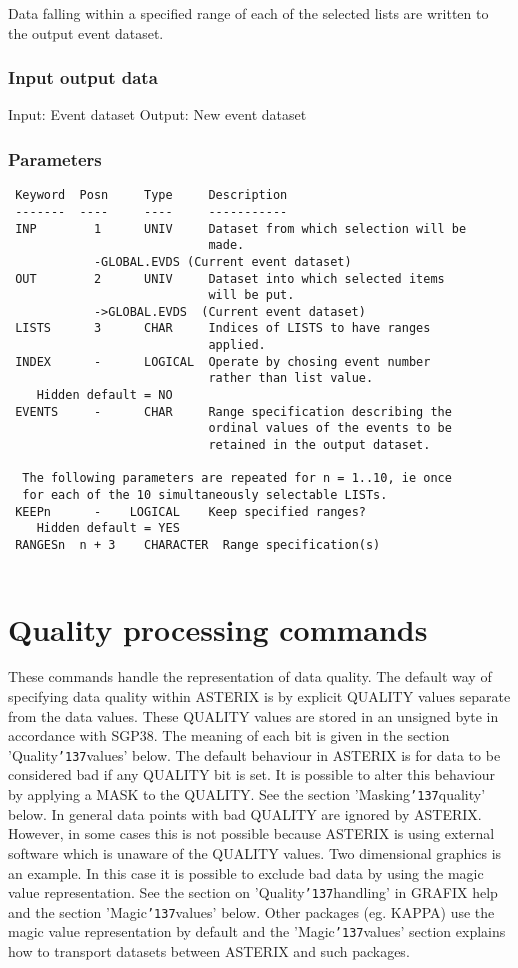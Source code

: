 \documentclass{book}
\renewcommand{\_}{{\tt\char'137}}     %
\begin{document}
Data falling within a specified range of each of the selected
lists are written to the output event dataset.
 
\subsection{Input output data}
Input: Event dataset
Output: New event dataset
\subsection{Parameters}
\begin{verbatim}
 Keyword  Posn     Type     Description
 -------  ----     ----     -----------
 INP        1      UNIV     Dataset from which selection will be
                            made.
            -GLOBAL.EVDS (Current event dataset)
 OUT        2      UNIV     Dataset into which selected items
                            will be put.
            ->GLOBAL.EVDS  (Current event dataset)
 LISTS      3      CHAR     Indices of LISTS to have ranges
                            applied.
 INDEX      -      LOGICAL  Operate by chosing event number
                            rather than list value.
    Hidden default = NO
 EVENTS     -      CHAR     Range specification describing the
                            ordinal values of the events to be
                            retained in the output dataset.
 
  The following parameters are repeated for n = 1..10, ie once
  for each of the 10 simultaneously selectable LISTs.
 KEEPn      -    LOGICAL    Keep specified ranges?
    Hidden default = YES
 RANGESn  n + 3    CHARACTER  Range specification(s)
 
\end{verbatim}\chapter{Quality processing commands}
These commands handle the representation of data quality. The default
way of specifying data quality within ASTERIX is by explicit QUALITY
values separate from the data values. These QUALITY values are stored
in an unsigned byte in accordance with SGP38. The meaning of each bit
is given in the section 'Quality\_values' below. The default behaviour
in ASTERIX is for data to be considered bad if any QUALITY bit is set.
It is possible to alter this behaviour by applying a MASK to the QUALITY.
See the section 'Masking\_quality' below. In general data points with bad
QUALITY are ignored by ASTERIX. However, in some cases this is not
possible because ASTERIX is using external software which is unaware of
the QUALITY values. Two dimensional graphics is an example. In this
case it is possible to exclude bad data by using the magic value
representation. See the section on 'Quality\_handling' in GRAFIX help
and the section 'Magic\_values' below. Other packages (eg. KAPPA) use
the magic value representation by default and the 'Magic\_values' section
explains how to transport datasets between ASTERIX and such packages.
 
\end{document}

